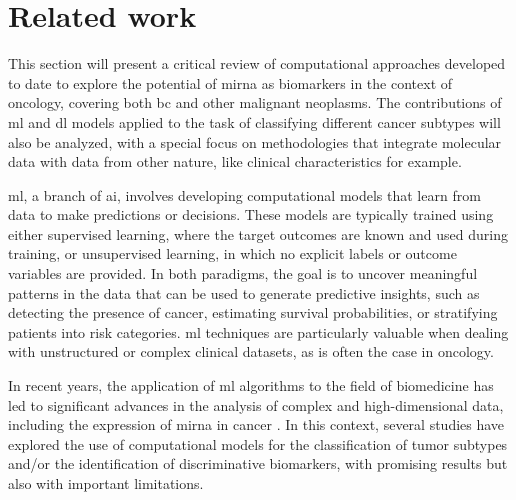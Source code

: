 

\newpage
\section{Related work}

This section will present a critical review of computational approaches
developed to date to explore the potential of \gls{mirna} as biomarkers in the
context of oncology, covering both \gls{bc} and other malignant neoplasms. The
contributions of \gls{ml} and \gls{dl} models applied to the task of
classifying different cancer subtypes will also be analyzed, with a special
focus on methodologies that integrate molecular data with data from other
nature, like clinical characteristics for example.

\gls{ml}, a branch of \gls{ai}, involves
developing computational models that learn from data to make predictions or
decisions. These models are typically trained using either supervised
learning, where the target outcomes are known and used during training, or
unsupervised learning, in which no explicit labels or outcome variables are
provided. In both paradigms, the goal is to uncover meaningful patterns in the
data that can be used to generate predictive insights, such as detecting the
presence of cancer, estimating survival probabilities, or stratifying patients
into risk categories. \gls{ml} techniques are particularly valuable when dealing with
unstructured or complex clinical datasets, as is often the case in oncology.

In recent years, the application of \gls{ml} algorithms to the field of
biomedicine has led to significant advances in the analysis of complex and
high-dimensional data, including the expression of \gls{mirna} in cancer
\cite{role_of_ai_giger2021}. In this context, several studies have explored the
use of computational models for the classification of tumor subtypes and/or the
identification of discriminative biomarkers, with promising results but also
with important limitations.

